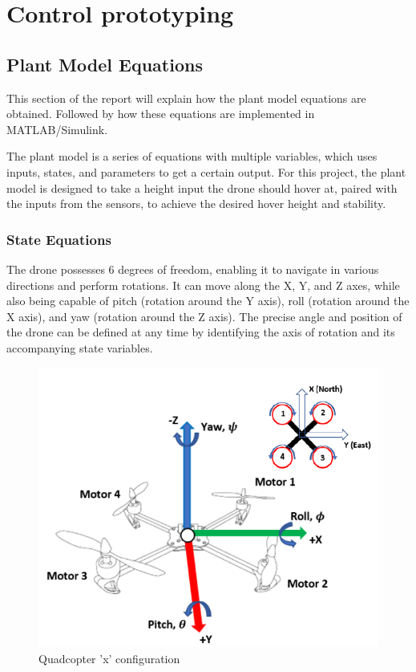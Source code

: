 \section{Control prototyping}
\subsection{Plant Model Equations}\label{plant_eq}
This section of the report will explain how the plant model equations are obtained. Followed by how these equations are implemented in MATLAB/Simulink.

The plant model is a series of equations with multiple variables, which uses inputs, states, and parameters to get a certain output. 
For this project, the plant model is designed to take a height input the drone should hover at, paired with the inputs from the sensors, to achieve the desired hover height and stability.

\subsubsection{State Equations}
The drone possesses 6 degrees of freedom, enabling it to navigate in various directions and perform rotations. It can move along the X, Y, and Z axes, while also being capable of pitch (rotation around the Y axis), roll (rotation around the X axis), and yaw (rotation around the Z axis). The precise angle and position of the drone can be defined at any time by identifying the axis of rotation and its accompanying state variables.
\cite{Ferry}

\begin{figure}[H]
\begin{center}
    \includegraphics[scale =0.7]{pictures/control/drone directionals.png}
\end{center}
\caption{Quadcopter 'x' configuration \cite{Ferry}}
\end{figure}


